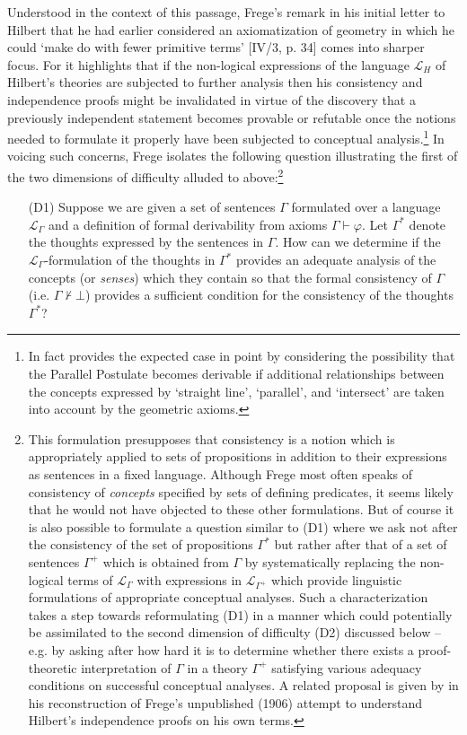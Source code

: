 \documentclass[11pt,fleqn,leqno]{article}
\def\phi{\varphi}
\def\proves{\vdash}
\begin{document}
Understood in the context of this passage, Frege's remark in his initial letter to Hilbert  that he had earlier considered an axiomatization of geometry in which he could `make do with fewer primitive terms' [IV/3, p. 34]  comes into sharper focus.  For it highlights that if the non-logical expressions of the language $\mathcal{L}_{H}$ of Hilbert's theories are subjected to further analysis then his consistency and independence proofs might be invalidated in virtue of the discovery that a previously independent statement becomes provable or refutable once the notions needed to formulate it properly have been subjected to conceptual analysis.\footnote{In fact \citet[p. 247]{Frege1914a} provides the expected case in point by considering the possibility that the Parallel Postulate becomes derivable if additional relationships between the concepts expressed by `straight line', `parallel', and `intersect' are taken into account by the geometric axioms.} In voicing such concerns, Frege isolates the following question illustrating the first of the two dimensions of difficulty alluded to above:\footnote{This formulation presupposes that consistency is a notion which is appropriately applied to sets of propositions in addition to their expressions as sentences in a fixed language.   Although Frege most often speaks of consistency of \textsl{concepts} specified by sets of defining predicates, it seems likely that he would not have objected to these other formulations.  But of course it is also possible to formulate a question similar to (D1) where we ask not after the consistency of the set of propositions $\Gamma^*$ but rather after that of a set of sentences $\Gamma^+$ which is obtained from $\Gamma$ by systematically replacing the non-logical terms of $\mathcal{L}_{\Gamma}$ with expressions in $\mathcal{L}_{\Gamma^+}$ which provide linguistic formulations of appropriate conceptual analyses.   Such a characterization takes a step towards reformulating (D1) in a manner which could potentially be assimilated to the second dimension of difficulty (D2) discussed below -- e.g. by asking after how hard it is to determine whether there exists a proof-theoretic interpretation of $\Gamma$ in a theory $\Gamma^+$ satisfying various adequacy conditions on successful conceptual analyses.  A related proposal is given by \citet{Eder2015} in his reconstruction of Frege's unpublished (1906) attempt to understand Hilbert's independence proofs on his own terms.}
\begin{itemize}
\item[(D1)]  Suppose we are given a set of sentences $\Gamma$ formulated over a language $\mathcal{L}_{\Gamma}$ and a definition of formal derivability from axioms $\Gamma \proves \phi$.  Let $\Gamma^*$ denote the thoughts expressed by the sentences in $\Gamma$.   How can we determine if the $\mathcal{L}_{\Gamma}$-formulation of the thoughts in $\Gamma^*$ provides an adequate analysis of the concepts (or \textsl{senses}) which they contain so that the formal consistency of $\Gamma$ (i.e. $\Gamma \not\proves \bot$) provides a sufficient condition for the consistency of the thoughts $\Gamma^*$?
\end{itemize}
\end{document}
